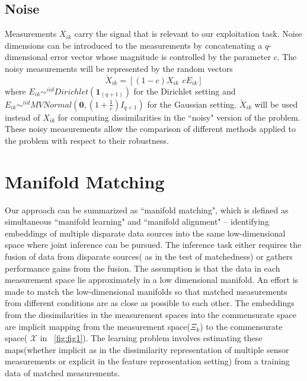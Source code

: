 \documentclass[11pt]{article} %
\begin{document}
\subsection{Noise\label{noise}}
Measurements $X_{ik}$ carry the signal that is relevant to our exploitation task. Noise dimensions can be introduced to  the measurements by concatenating a $q$-dimensional error vector whose magnitude is controlled by the parameter $c$. The noisy measurements will be  represented by the random vectors 
 \begin{equation}
\breve{X}_{ik}=[(1-c)X_{ik}\hspace{5pt} cE_{ik}]\label{eq:noise-expr}
\end{equation}
 where $E_{ik} \sim^{iid} Dirichlet(\bm{1}_{(q+1)})\label{eq:noise-model-dir} $ for the Dirichlet setting and $E_{ik} \sim^{iid} MVNormal(\bm{0} , (1+\frac{1}{r})I_{q+1}) \label{eq:noise-model-mvn} $ for the Gaussian setting. $\breve{X}_{ik}$ will be used instead of ${X}_{ik}$ for computing dissimilarities in the ``noisy" version of the problem. These noisy measurements allow the comparison of  different methods applied to the problem with respect to their robustness.
  

\section{Manifold Matching\label{sec:JOFC}}
  Our approach can be summarized as  ``manifold matching", which is defined as simultaneous ``manifold learning" and ``manifold alignment" -- identifying embeddings of multiple disparate data sources into the same low-dimensional space where joint inference can be pursued. The inference task either requires the fusion of data from disparate sources( as in the test of matchedness) or gathers performance gains from the fusion. The assumption is that the data in each measurement space lie approximately in a low dimensional manifold. An effort is made to match the low-dimensional manifolds so that matched measurements from different conditions are as close as possible to each other.  The embeddings from the dissimilarities in the measurement spaces into the commensurate space are implicit mapping from the measurement space($\Xi_k$)  to the commensurate space( $\mathcal{X}$ in ~\ref{fig:fig1}). The learning problem involves estimating these maps(whether implicit as in the dissimilarity representation of multiple sensor measurements or explicit in the  feature representation setting)  from a training data of matched measurements.
\end{document}
